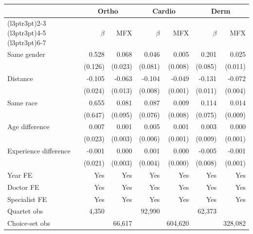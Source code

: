 \begin{tabular}{lrrrrrr}
\toprule
\multicolumn{1}{c}{ } & \multicolumn{2}{c}{Ortho} & \multicolumn{2}{c}{Cardio} & \multicolumn{2}{c}{Derm} \\
\cmidrule(l{3pt}r{3pt}){2-3} \cmidrule(l{3pt}r{3pt}){4-5} \cmidrule(l{3pt}r{3pt}){6-7}
 & $\beta$ & MFX & $\beta$ & MFX & $\beta$ & MFX\\
\midrule
Same gender & 0.528 & 0.068 & 0.046 & 0.005 & 0.201 & 0.025\\
 & (0.126) & (0.023) & (0.081) & (0.008) & (0.085) & (0.011)\\
Distance & -0.105 & -0.063 & -0.104 & -0.049 & -0.131 & -0.072\\
 & (0.024) & (0.013) & (0.008) & (0.001) & (0.011) & (0.004)\\
Same race & 0.655 & 0.081 & 0.087 & 0.009 & 0.114 & 0.014\\
 & (0.647) & (0.095) & (0.076) & (0.008) & (0.075) & (0.009)\\
Age difference & 0.007 & 0.001 & 0.005 & 0.001 & 0.003 & 0.000\\
 & (0.023) & (0.003) & (0.006) & (0.001) & (0.009) & (0.001)\\
Experience difference & -0.001 & 0.000 & 0.001 & 0.000 & -0.005 & -0.001\\
 & (0.021) & (0.003) & (0.004) & (0.000) & (0.008) & (0.001)\\
\midrule
Year FE & Yes & Yes & Yes & Yes & Yes & Yes\\
Doctor FE & Yes & Yes & Yes & Yes & Yes & Yes\\
Specialist FE & Yes & Yes & Yes & Yes & Yes & Yes\\
\midrule
Quartet obs & 4,350 &  & 92,990 &  & 62,373 & \\
Choice-set obs &  & 66,617 &  & 604,620 &  & 328,082\\
\bottomrule
\end{tabular}
